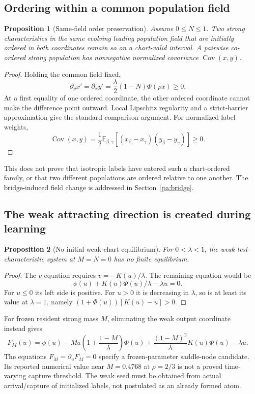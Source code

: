 \documentclass[11pt]{article}
\numberwithin{equation}{section}
\newtheorem{proposition}{Proposition}[section]
\theoremstyle{definition}
\theoremstyle{remark}
\newcommand{\E}{\mathbb E}
\newcommand{\1}{\mathbf 1}
\DeclareMathOperator{\Cov}{Cov}
\begin{document}
\subsection{Ordering within a common population field}
\begin{proposition}[Same-field order preservation]\label{pa:order}
Assume $0\le N\le1$. Two strong characteristics in the same evolving
leading population field that are initially ordered in both coordinates
remain so on a chart-valid interval. A pairwise co-ordered strong population
has nonnegative normalized covariance $\Cov(x,y)$.
\end{proposition}
\begin{proof}
Holding the common field fixed,
\[
 \partial_y x'=\partial_x y'
 =\frac\lambda2(1-N)\Phi(\rho x)\ge0.
\]
At a first equality of one ordered coordinate, the other ordered coordinate
cannot make the difference point outward. Local Lipschitz regularity and
a strict-barrier approximation give the standard comparison argument.
For normalized label weights,
\[
 \Cov(x,y)=\frac12\E_{\beta,\gamma}
 [(x_\beta-x_\gamma)(y_\beta-y_\gamma)]\ge0.
\]
\end{proof}
This does not prove that isotropic labels have entered such a chart-ordered
family, or that two different populations are ordered relative to one
another. The bridge-induced field change is addressed in
Section~\ref{pa:bridge}.

\subsection{The weak attracting direction is created during learning}
\begin{proposition}[No initial weak-chart equilibrium]\label{pa:noweakeq}
For $0<\lambda<1$, the weak test-characteristic system at $M=N=0$ has no
finite equilibrium.
\end{proposition}
\begin{proof}
The $v$ equation requires $v=-K(u)/\lambda$. The remaining equation would be
\[
 \phi(u)+K(u)\Phi(u)/\lambda-\lambda u=0.
\]
For $u\le0$ its left side is positive. For $u>0$ it is decreasing in
$\lambda$, so is at least its value at $\lambda=1$, namely
$(1+\Phi(u))[K(u)-u]>0$.
\end{proof}
For frozen resident strong mass $M$, eliminating the weak output coordinate
instead gives
\begin{equation}\label{pa:frozen-weak}
 F_M(u)=\phi(u)-Ma\left(1+\frac{1-M}{\lambda}\right)\Phi(u)
 +\frac{(1-M)^2}{\lambda}K(u)\Phi(u)-\lambda u.
\end{equation}
The equations $F_M=\partial_uF_M=0$ specify a frozen-parameter saddle-node
candidate. Its reported numerical value near $M=0.4768$ at $\rho=2/3$ is
not a proved time-varying capture threshold. The weak seed must be obtained
from actual arrival/capture of initialized labels, not postulated as an
already formed atom.
\end{document}
